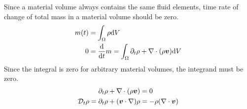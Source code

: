 Since a material volume always contains the same fluid elements, time rate of change of total mass in a material volume should be zero.
\begin{equation}
\begin{split}
    m(t) &= \int_{\Omega}\rho\mathrm{d} V \\
    0 &= \frac{\mathrm{d}}{\mathrm{d} t}m = \int_{\Omega}\partial_{t}\rho +
    \nabla\cdot(\rho\boldsymbol{v}) \mathrm{d} V
\end{split}
\end{equation}
Since the integral is zero for arbitrary material volumes, the integrand must be zero.
\begin{equation}
\begin{split}
    \partial_{t}\rho + \nabla\cdot(\rho\boldsymbol{v}) &= 0 \\
    \mathcal{D}_t\rho = \partial_{t}\rho + (\boldsymbol{v}\cdot\nabla)\rho &= -\rho(\nabla\cdot\boldsymbol{v})
\end{split}
\end{equation}

